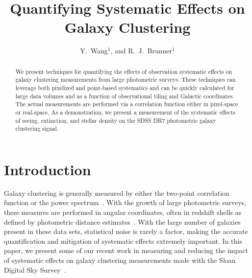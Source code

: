 \documentclass[11pt,twoside]{article}
\begin{document}
\title{Quantifying Systematic Effects on Galaxy Clustering}
\author{Y.~Wang$^1$, and R.~J.~Brunner$^1$ \\
}

\begin{abstract}
We present techniques for quantifying the effects of observation systematic effects on galaxy clustering measurements from large photometric surveys. These techniques can leverage both pixelized and point-based systematics and can be quickly calculated for large data volumes and as a function of observational tiling and Galactic coordinates. The actual measurements are performed via a correlation function either in pixel-space or real-space. As a demonstration, we present a measurement of the systematic effects of seeing, extinction, and stellar density on the SDSS DR7 photometric galaxy clustering signal. %
\end{abstract}


\section{Introduction}

Galaxy clustering is generally measured by either the two-point correlation function or the power spectrum~\citep[see, \textit{e.g.},][]{Peebles}.  With the growth of large photometric surveys, these measures are performed in angular coordinates, often in redshift shells as defined by photometric distance estimates~\citep[see, \textit{e.g.},][]{Ross07, Hayes13}. With the large number of galaxies present in these data sets, statistical noise is rarely a factor, making the accurate quantification and mitigation of systematic effects extremely important. In this paper, we present some of our recent work in measuring and reducing the impact of systematic effects on galaxy clustering measurements made with the Sloan Digital Sky Survey~\citep{York00}.
\end{document}
